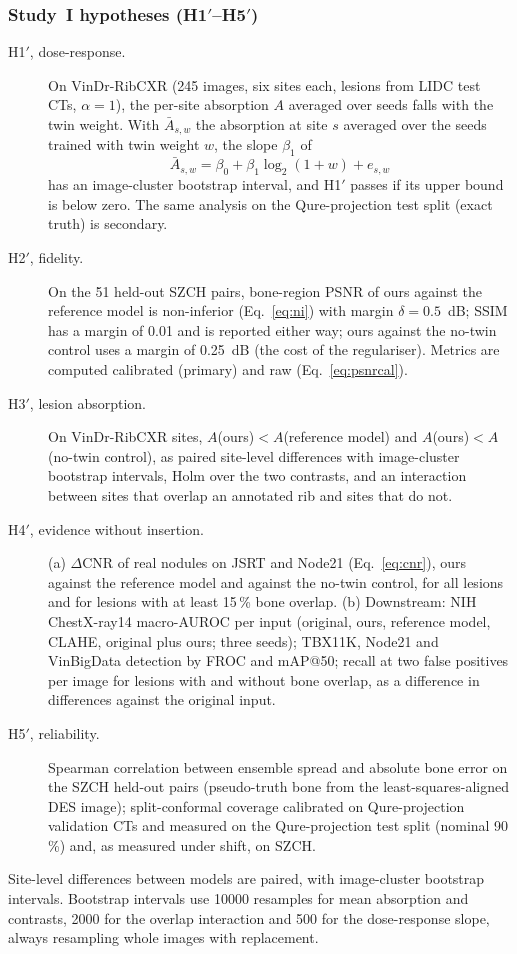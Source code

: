 \subsubsection{Study~I hypotheses (H1$'$--H5$'$)}
\begin{description}
\item[H1$'$, dose-response.] On VinDr-RibCXR (245 images, six sites each, lesions from LIDC test CTs, $\alpha=1$), the per-site absorption
 $A$ averaged over seeds falls with the twin weight. With $\bar A_{s,w}$ the absorption at site $s$ averaged over the seeds trained with
 twin weight $w$, the slope $\beta_1$ of
 \begin{equation}
 \bar A_{s,w}=\beta_0+\beta_1\log_2(1+w)+e_{s,w}
 \label{eq:dose}
 \end{equation}
 has an image-cluster bootstrap interval, and H1$'$ passes if its upper bound is below zero. The same analysis on the Qure-projection
 test split (exact truth) is secondary.
\item[H2$'$, fidelity.] On the 51 held-out SZCH pairs, bone-region PSNR of ours against the reference model is non-inferior
 (Eq.~\eqref{eq:ni}) with margin $\delta=0.5$~dB; SSIM has a margin of 0.01 and is reported either way; ours against the no-twin control
 uses a margin of 0.25~dB (the cost of the regulariser). Metrics are computed calibrated (primary) and raw (Eq.~\eqref{eq:psnrcal}).
\item[H3$'$, lesion absorption.] On VinDr-RibCXR sites, $A$(ours)$<A$(reference model) and $A$(ours)$<A$(no-twin control), as paired
 site-level differences with image-cluster bootstrap intervals, Holm over the two contrasts, and an interaction between sites that overlap
 an annotated rib and sites that do not.
\item[H4$'$, evidence without insertion.] (a) $\Delta$CNR of real nodules on JSRT and Node21 (Eq.~\eqref{eq:cnr}), ours against the
 reference model and against the no-twin control, for all lesions and for lesions with at least 15\,\% bone overlap. (b) Downstream: NIH
 ChestX-ray14 macro-AUROC per input (original, ours, reference model, CLAHE, original plus ours; three seeds); TBX11K, Node21 and
 VinBigData detection by FROC and mAP@50; recall at two false positives per image for lesions with and without bone overlap, as a
 difference in differences against the original input.
\item[H5$'$, reliability.] Spearman correlation between ensemble spread and absolute bone error on the SZCH held-out pairs (pseudo-truth
 bone from the least-squares-aligned DES image); split-conformal coverage calibrated on Qure-projection validation CTs and measured on the
 Qure-projection test split (nominal 90\,\%) and, as measured under shift, on SZCH.
\end{description}
Site-level differences between models are paired, with image-cluster bootstrap intervals. Bootstrap intervals use \num{10000} resamples for
mean absorption and contrasts, \num{2000} for the overlap interaction and 500 for the dose-response slope, always resampling whole images
with replacement.

